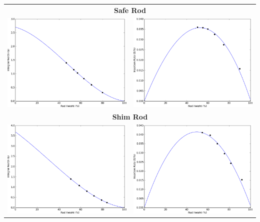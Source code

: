 \documentclass[12pt]{article}
\begin{document}
{\newpage
{}
\begin{center}
    \begin{tabular}{c c}
    \multicolumn{2}{c}{\textbf{Safe Rod}} \\
    \includegraphics[width=3.2in]{safe-integral} & \includegraphics[width=3.2in]{safe-rate} \\
    \multicolumn{2}{c}{\textbf{Shim Rod}} \\
    \includegraphics[width=3.2in]{shim-integral} & \includegraphics[width=3.2in]{shim-rate} \\

\end{tabular}
\end{center}}
\end{document}
